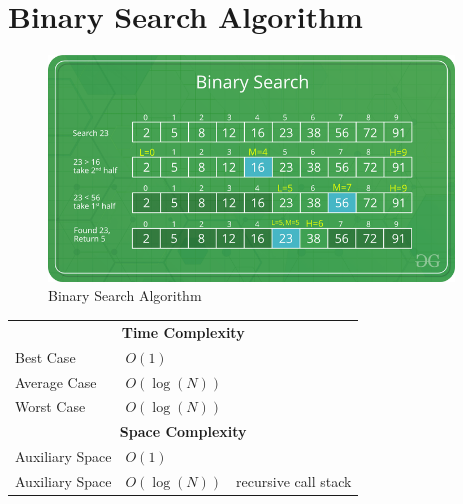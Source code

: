 \section{Binary Search Algorithm \cite{gfg-binary-search}} \label{Binary Search Algorithm}

\begin{table}[H]
    \begin{minipage}[t]{0.45\linewidth}
        \begin{figure}[H]
            \centering
            \includegraphics[width=\linewidth,height=6cm,keepaspectratio]{Pictures/ds-algo/BinarySearch.png}
            \caption{Binary Search Algorithm}
        \end{figure}
    \end{minipage}
    \hfill
    \begin{minipage}[t]{0.55\linewidth}
        \begin{table}[H]
            \begin{tabular}{l l l}
                \multicolumn{3}{c}{\textbf{Time Complexity}} \\
                 Best Case & $O(1)$ & \\
                 Average Case & $O(\log(N))$ &  \\
                 Worst Case & $O(\log(N))$ &  \\
                 \multicolumn{3}{c}{\textbf{Space Complexity}}\\
                 Auxiliary Space & $O(1)$ & \\
                 Auxiliary Space & $O(\log(N))$ & recursive call stack \\
            \end{tabular}
        \end{table}
    \end{minipage}
\end{table}


